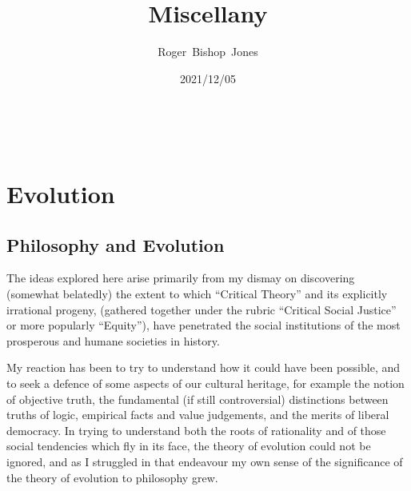 \documentclass[10pt,titlepage]{book}
\title{Miscellany}
\author{Roger~Bishop~Jones}
\date{\small 2021/12/05}
\newcommand{\ignore}[1]{}
\begin{document}
\frontmatter

                               
\begin{titlepage}
\maketitle





\end{titlepage}

\ \

\ignore{
\begin{centering}
{}
\end{centering}
}%

\setcounter{tocdepth}{2}
{\parskip-0pt\tableofcontents}


\mainmatter

\pagebreak

\part{Evolution}

\chapter{Philosophy and Evolution}

The ideas explored here arise primarily from my dismay on discovering (somewhat belatedly) the extent to which ``Critical Theory'' and its explicitly irrational progeny, (gathered together under the rubric ``Critical Social Justice'' or more popularly ``Equity''), have penetrated the social institutions of the most prosperous and humane societies in history.

My reaction has been to try to understand how it could have been possible, and to seek a defence of some aspects of our cultural heritage, for example the notion of objective truth, the fundamental (if still controversial) distinctions between truths of logic, empirical facts and value judgements, and the merits of liberal democracy.
In trying to understand both the roots of rationality and of those social tendencies which fly in its face, the theory of evolution could not be ignored, and as I struggled in that endeavour my own sense of the significance of the theory of evolution to philosophy grew.
\end{document}
